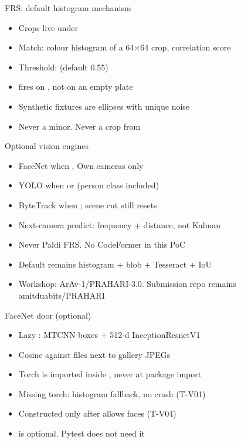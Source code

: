 \documentclass[aspectratio=169,11pt]{beamer}
\begin{document}
\begin{frame}{FRS: default histogram mechanism}
\begin{itemize}\itemsep0.55em
\item Crops live under 
\item Match: colour histogram of a 64$\times$64 crop, correlation score
\item Threshold:  (default 0.55)
\item {} fires on , not on an empty plate
\item Synthetic fixtures are ellipses with unique noise
\item Never a minor. Never a crop from 
\end{itemize}
\end{frame}

\begin{frame}{Optional vision engines}
\begin{itemize}\itemsep0.5em
\item FaceNet when , Own cameras only
\item YOLO when  or  (person class included)
\item ByteTrack when ; scene cut still resets
\item Next-camera predict: frequency + distance, not Kalman
\item Never Paldi FRS. No CodeFormer in this PoC
\item Default remains histogram + blob + Tesseract + IoU
\item Workshop: ArAv-1/PRAHARI-3.0. Submission repo remains amitduabits/PRAHARI
\end{itemize}
\end{frame}

\begin{frame}{FaceNet door (optional)}
\begin{itemize}\itemsep0.55em
\item Lazy : MTCNN boxes + 512-d InceptionResnetV1
\item Cosine against  files next to gallery JPEGs
\item Torch is imported inside , never at package import
\item Missing torch: histogram fallback, no crash (T-V01)
\item Constructed only after  allows faces (T-V04)
\item {} is optional. Pytest does not need it
\end{itemize}
\end{frame}
\end{document}
